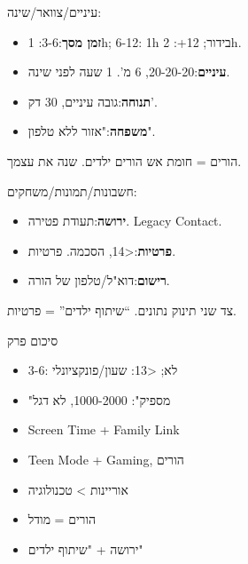 
עיניים/צוואר/שינה:

\begin{itemize}
  \item \textbf{זמן מסך}:3-6: 1h; 6-12: 1h בידור; 12+: 2h.
  \item \textbf{עיניים}:20-20-20, 6 מ'. 1 שעה לפני שינה.
  \item \textbf{תנוחה}:גובה עיניים, 30 דק'.
  \item \textbf{משפחה}:"אזור ללא טלפון".
\end{itemize}

\begin{tcbinfo}{הורים = חומת אש}
הורים ילדים. שנה את עצמך.

\end{tcbinfo}


חשבונות/תמונות/משחקים:

\begin{itemize}
  \item \textbf{ירושה}:תעודת פטירה. Legacy Contact.
  \item \textbf{פרטיות}:<14, הסכמה. פרטיות.
  \item \textbf{רישום}:דוא"ל/טלפון של הורה.
\end{itemize}

\begin{tcbwarn}{צד שני}
תינוק נתונים. “שיתוף ילדים” = פרטיות.

\end{tcbwarn}

\begin{tcbsummary}{סיכום פרק}
\begin{itemize}
  \item 3-6: לא; <13: שעון/פונקציונלי
  \item "מספיק": 1000-2000, לא דגל
  \item Screen Time + Family Link
  \item Teen Mode + Gaming, הורים
  \item אוריינות > טכנולוגיה
  \item הורים = מודל
  \item ירושה + "שיתוף ילדים"
\end{itemize}

\end{tcbsummary}
